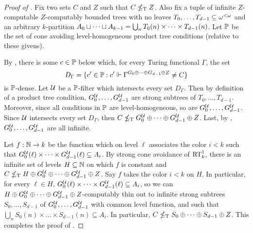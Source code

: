 \begin{proof}[Proof of ]
Fix two sets $C$ and $Z$ such that $C \nleq_{\text{\upshape T}} Z$.
Also fix a tuple of infinite $Z$-computable $Z$-computably bounded trees with no leaves $T_0, \dots, T_{d-1} \subseteq {\omega^{<\omega}}$ and an arbitrary $k$-partition $A_0 \sqcup \dots \sqcup A_{k-1} = \bigcup_n {T}_0(n) \times \dots \times {T}_{d-1}(n)$. Let $\mathbb{P}$ be the set of cone avoiding level-homogeneous product tree conditions (relative to these givens).


By , there is some $c \in \mathbb{P}$ below which, for every Turing functional $\Gamma$, the set
\[
D_\Gamma = \{ c' \in \mathbb{P}: c' \Vdash \Gamma^{G_0 \oplus \dots \oplus G_{d-1} \oplus Z} \neq C \}
\]
is $\mathbb{P}$-dense.
Let $\mathcal{U}$ be a $\mathbb{P}$-filter which intersects every set $D_\Gamma$.
Then by definition of a product tree condition, $G^{\mathcal{U}}_0, \dots, G^{\mathcal{U}}_{d-1}$ are strong subtrees of $T_0, \dots, T_{d-1}$. Moreover, since all conditions in $\mathbb{P}$ are level-homogeneous, so are $G^{\mathcal{U}}_0, \dots, G^{\mathcal{U}}_{d-1}$. Since  $\mathcal{U}$ intersects every set $D_\Gamma$, then $C \nleq_{\text{\upshape T}} G^{\mathcal{U}}_0 \oplus \dots \oplus G^{\mathcal{U}}_{d-1} \oplus Z$.
Last, by , $G^{\mathcal{U}}_0, \dots, G^{\mathcal{U}}_{d-1}$ are all infinite.


Let $f: \mathbb{N} \to k$ be the function which on level $\ell$ associates the color $i < k$
such that $G^{\mathcal{U}}_0(\ell) \times \dots \times G^{\mathcal{U}}_{d-1}(\ell) \subseteq A_i$.
By strong cone avoidance of $\mathrm{RT}^{1}_{k}$, there is an infinite set of levels $H \subseteq \mathbb{N}$ on which $f$ is constant and
$C \nleq_{\text{\upshape T}} H \oplus G^{\mathcal{U}}_0 \oplus \dots \oplus G^{\mathcal{U}}_{d-1} \oplus Z$. Say $f$ takes the color $i < k$ on $H$. In particular, for every $\ell \in H$, $G^{\mathcal{U}}_0(\ell) \times \dots \times G^{\mathcal{U}}_{d-1}(\ell) \subseteq A_i$, so we can $H \oplus G^{\mathcal{U}}_0 \oplus \dots \oplus G^{\mathcal{U}}_{d-1} \oplus Z$-computably thin out to infinite strong subtrees $S_0, \dots, S_{d-1}$
of  $G^{\mathcal{U}}_0, \dots, G^{\mathcal{U}}_{d-1}$ with common level function,
and such that $\bigcup_n S_0(n) \times \dots \times S_{d-1}(n) \subseteq A_i$.
In particular, $C \nleq_{\text{\upshape T}} S_0 \oplus \dots \oplus S_{d-1} \oplus Z$.
This completes the proof of .
\end{proof}

